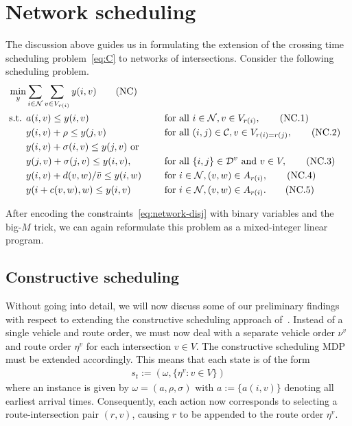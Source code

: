 \documentclass[a4paper]{report}
\theoremstyle{definition}
\theoremstyle{plain}
\begin{document}
\section{Network scheduling}

The discussion above guides us in formulating the extension of the crossing time scheduling problem~\eqref{eq:C} to networks of intersections.
Consider the following scheduling problem.
\begin{alignat}{3}
  \min_{y} & \sum_{i \in \mathcal{N}} \sum_{v \in V_{r(i)}} y(i, v) \tag{NC} \label{NC} \\
  \text{ s.t. } & a(i, v) \leq y(i, v) && \text{ for all } i \in \mathcal{N}, v \in V_{r(i)} , \tag{NC.1}\label{eq:travel} \\
                & y(i, v) + \rho \leq y(j, v) && \text{ for all } (i, j) \in \mathcal{C}, v \in V_{r(i)=r(j)} , \tag{NC.2} \\
                & y(i,v) + \sigma(i,v) \leq y(j,v) \text{ or } \quad \notag \\
                & y(j,v) + \sigma(j,v) \leq y(i,v) , && \text{ for all } \{i,j\} \in \mathcal{D}^{v} \text{ and } v \in V, \tag{NC.3} \label{eq:network-disj} \\
                & y(i, v) + d(v,w) / \bar{v} \leq y(i, w) && \text{ for } i \in \mathcal{N} , (v,w) \in A_{r(i)}, \tag{NC.4} \label{eq:travel} \\
                & y(i + c(v,w), w) \leq y(i, v) && \text{ for  } i \in \mathcal{N}, (v,w ) \in A_{r(i)} . \tag{NC.5} \label{eq:buffer}
\end{alignat}

After encoding the constraints~\eqref{eq:network-disj} with binary variables and
the big-$M$ trick, we can again reformulate this problem as a mixed-integer
linear program.

\subsection{Constructive scheduling}

Without going into detail, we will now discuss some of our preliminary findings
with respect to extending the constructive scheduling approach
of~.
%
Instead of a single vehicle and route order, we must now deal with a separate
vehicle order $\nu^v$ and route order $\eta^v$ for each intersection $v \in V$.
%
The constructive scheduling MDP must be extended accordingly. This means that
each state is  of the form
\begin{align}
  s_t := (\omega, \{ \eta^v : v \in V \})
\end{align}
where an instance is given by $\omega = (a, \rho, \sigma)$ with $a := \{ a(i,v) \}$ denoting all
earliest arrival times.
%
Consequently, each action now corresponds to selecting a route-intersection pair
$(r, v)$, causing $r$ to be appended to the route order $\eta^v$.
\end{document}
